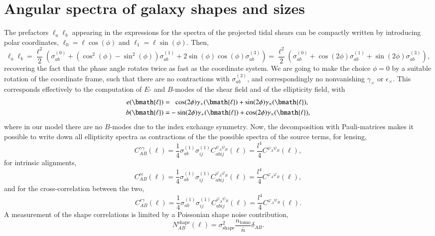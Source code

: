 \documentclass[a4paper,fleqn,usenatbib]{mnras}
\newcommand{\vecl}{\bmath{\ell}}
\begin{document}
\section{Angular spectra of galaxy shapes and sizes}\label{sect_spectra}
The prefactors $\ell_a\ell_b$ appearing in the expressions for the spectra of the projected tidal shears can be compactly written by introducing polar coordinates, $\ell_0 = \ell\cos(\phi)$ and $\ell_1 = \ell\sin(\phi)$. Then,
\begin{equation}
\ell_a\ell_b = 
\frac{\ell^2}{2}\left(\sigma^{(0)}_{ab} + (\cos^2(\phi)-\sin^2(\phi))\sigma^{(1)}_{ab} + 2\sin(\phi)\cos(\phi)\sigma^{(3)}_{ab}\right) = 
\frac{\ell^2}{2}\left(\sigma^{(0)}_{ab} + \cos(2\phi)\sigma^{(1)}_{ab} + \sin(2\phi)\sigma^{(3)}_{ab}\right),
\end{equation}
recovering the fact that the phase angle rotates twice as fast as the coordinate system. We are going to make the choice $\phi = 0$ by a suitable rotation of the coordinate frame, such that there are no contractions with $\sigma^{(3)}_{ab}$, and correspondingly no nonvanishing $\gamma_\times$ or $\epsilon_\times$. This corresponds effectively to the computation of $E$- and $B$-modes of the shear field and of the ellipticity field, with
\begin{align}
e(\vecl) = &\hphantom{-}\cos(2\phi)\gamma_+(\vecl) + \sin(2\phi)\gamma_\times(\vecl),\\
b(\vecl) = &-\sin(2\phi)\gamma_+(\vecl) + \cos(2\phi)\gamma_\times(\vecl),
\end{align}
where in our model there are no $B$-modes due to the index exchange symmetry. Now, the decomposition with Pauli-matrices makes it possible to write down all ellipticity spectra as contractions of the the possible spectra of the source terms, for lensing,
\begin{equation}
C^{\gamma\gamma}_{AB}(\ell) = \frac{1}{4}\sigma^{(1)}_{ab}\sigma^{(1)}_{ij}C^{\psi_A\psi_B}_{abij}(\ell) = \frac{l^4}{4}C^{\psi_A\psi_B}(\ell),
\end{equation}
for intrinsic alignments,
\begin{equation}
C^{\epsilon\epsilon}_{AB}(\ell) = \frac{1}{4}\sigma^{(1)}_{ab}\sigma^{(1)}_{ij}C^{\varphi_A\varphi_B}_{abij}(\ell) = \frac{l^4}{4}C^{\varphi_A\varphi_B}(\ell),
\end{equation}
and for the cross-correlation between the two,
\begin{equation}
C^{\epsilon\gamma}_{AB}(\ell) = \frac{1}{4}\sigma^{(1)}_{ab}\sigma^{(1)}_{ij}C^{\varphi_A\psi_B}_{abij}(\ell) = \frac{l^4}{4}C^{\varphi_A\psi_B}(\ell).
\end{equation}
A measurement of the shape correlations is limited by a Poissonian shape noise contribution,
\begin{equation}
N_{AB}^\mathrm{shape}(\ell) = \sigma^2_\mathrm{shape}\frac{n_\mathrm{tomo}}{\bar{n}}\delta_{AB}.
\end{equation}
\end{document}
